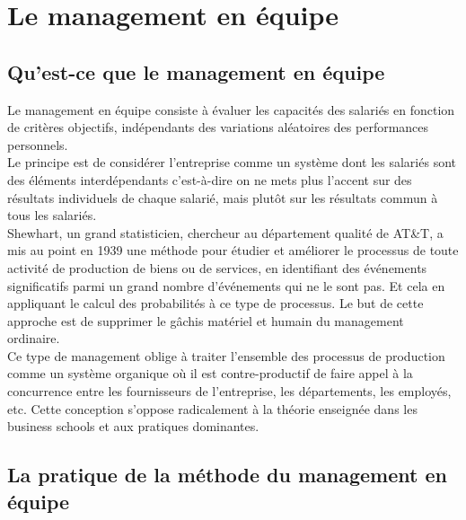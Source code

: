 \section{Le management en équipe}
\subsection{Qu'est-ce que le management en équipe}
Le management en équipe consiste à évaluer les capacités des salariés en fonction de critères objectifs, indépendants des variations aléatoires des performances personnels.\\
Le principe est de considérer l’entreprise comme un système dont les salariés sont des éléments interdépendants c’est-à-dire on ne mets plus l’accent sur des résultats individuels de chaque salarié, mais plutôt sur les résultats commun à tous les salariés.\\
Shewhart, un grand statisticien, chercheur au département qualité de AT\&T, a mis au point en 1939 une méthode pour étudier et améliorer le processus de toute activité de production de biens ou de services, en identifiant des événements significatifs parmi un grand nombre d'événements qui ne le sont pas. Et cela en appliquant le calcul des probabilités à ce type de processus. Le but de cette approche est de supprimer le gâchis matériel et humain du management ordinaire.\\ 
Ce type de management oblige à traiter l’ensemble des processus de production comme un système organique où il est contre-productif de faire appel à la concurrence entre les fournisseurs de l’entreprise, les départements, les employés, etc. Cette conception s'oppose radicalement à la théorie enseignée dans les business schools et aux pratiques dominantes. 

\subsection{La pratique de la méthode du management en équipe}


